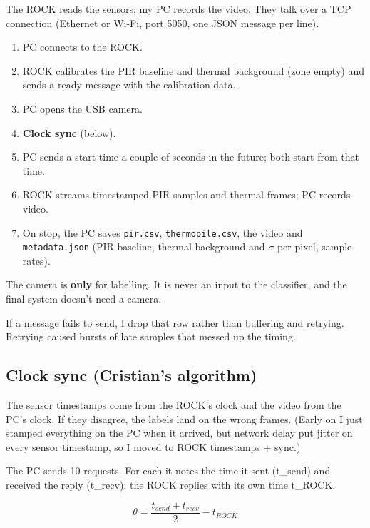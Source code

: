 \documentclass[11pt,a4paper]{article}
\providecommand{\tightlist}{\setlength{\itemsep}{0pt}\setlength{\parskip}{0pt}}
\begin{document}
The ROCK reads the sensors; my
PC records the video. They
talk over a TCP connection
(Ethernet or Wi-Fi, port 5050,
one JSON message per line).

\begin{enumerate}
\def\labelenumi{\arabic{enumi}.}
\tightlist
\item
  PC connects to the ROCK.
\item
  ROCK calibrates the PIR
  baseline and thermal
  background (zone empty) and
  sends a ready message with
  the calibration data.
\item
  PC opens the USB camera.
\item
  \textbf{Clock sync} (below).
\item
  PC sends a start time a
  couple of seconds in the
  future; both start from that
  time.
\item
  ROCK streams timestamped PIR
  samples and thermal frames;
  PC records video.
\item
  On stop, the PC saves
  \texttt{pir.csv},
  \texttt{thermopile.csv}, the
  video and
  \texttt{metadata.json} (PIR
  baseline, thermal background
  and $\sigma$ per pixel, sample
  rates).
\end{enumerate}

The camera is \textbf{only}
for labelling. It is never an
input to the classifier, and
the final system doesn't need
a camera.

If a message fails to send, I
drop that row rather than
buffering and retrying.
Retrying caused bursts of late
samples that messed up the
timing.

\hypertarget{clock-sync-cristians-algorithm}{%
\subsection{Clock sync
(Cristian's
algorithm)}\label{clock-sync-cristians-algorithm}}

The sensor timestamps come
from the ROCK's clock and the
video from the PC's clock. If
they disagree, the labels land
on the wrong frames. (Early on
I just stamped everything on
the PC when it arrived, but
network delay put jitter on
every sensor timestamp, so I
moved to ROCK timestamps +
sync.)

The PC sends 10 requests. For
each it notes the time it sent
(t\_send) and received the
reply (t\_recv); the ROCK
replies with its own time
t\_ROCK.

\[
\theta = \frac{t_{send} + t_{recv}}{2} - t_{ROCK}
\]
\end{document}
